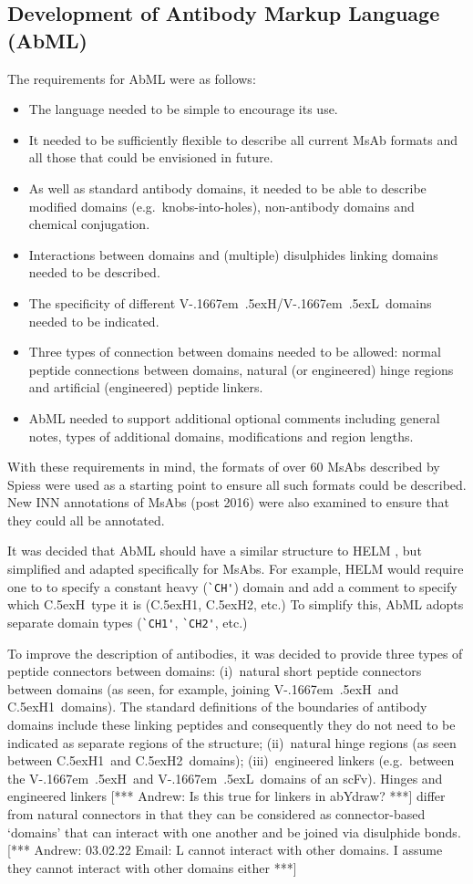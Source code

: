 \documentclass[a4paper]{article}
\newcommand{\VH}{\mbox{V\kern-.1667em \lower.5ex\hbox{\scriptsize H}}}
\newcommand{\VL}{\mbox{V\kern-.1667em \lower.5ex\hbox{\scriptsize L}}}
\newcommand{\VHVL}{\mbox{\VH/\VL}}
\newcommand{\CH}[1]{\mbox{C\lower.5ex\hbox{\scriptsize H}#1}}
\newcommand{\andrew}[1]{{\color{red} [*** Andrew: #1 ***]}}
\let\shortcite\cite
\begin{document}
\subsection{Development of Antibody Markup Language (AbML)}
The requirements for AbML were as follows:
\begin{itemize}
\item The language needed to be simple to encourage its use.
\item It needed to be sufficiently flexible to describe all current
  MsAb formats and all those that could be envisioned in future.
\item As well as standard antibody domains, it needed to be able to
  describe modified domains (e.g.\ knobs-into-holes), non-antibody
  domains and chemical conjugation.
\item Interactions between domains and (multiple) disulphides linking
  domains needed to be described.
\item The specificity of different \VHVL\ domains needed to be
  indicated.
\item Three types of connection between domains needed to be allowed:
  normal peptide connections between domains, natural (or engineered)
  hinge regions and artificial (engineered) peptide linkers.
\item AbML needed to support additional optional comments including
  general notes, types of additional domains, modifications and region
  lengths.
\end{itemize}
  
With these requirements in mind, the formats of over 60 MsAbs
described by Spiess \shortcite{spiess:2015} were used as a starting
point to ensure all such formats could be described. New INN
annotations of MsAbs (post 2016) were also examined to ensure that
they could all be annotated.

It was decided that AbML should have a similar structure to HELM
\cite{zhang:2012}, but simplified and adapted specifically for MsAbs.
For example, HELM would require one to
to specify a constant heavy (\verb|`CH'|) domain and add a
comment to specify which \CH\ type it is (\CH{1}, \CH{2}, etc.)
To simplify this, AbML adopts separate domain types (\verb|`CH1'|,
\verb|`CH2'|, etc.)

To improve the description of antibodies, it was decided to provide
three types of peptide connectors between domains: (i)~natural short
peptide connectors between domains (as seen, for example, joining \VH\
and \CH1\ domains). The standard definitions of the boundaries of
antibody domains include these linking peptides and consequently they
do not need to be indicated as separate regions of the structure;
(ii)~natural hinge regions (as seen between \CH1\ and \CH2\ domains);
(iii)~engineered linkers (e.g.\ between the \VH\ and \VL\ domains of
an scFv). Hinges and engineered linkers \andrew{Is this true for
  linkers in abYdraw?} differ from natural connectors in that they can
be considered as connector-based `domains' that can interact with one
another and be joined via disulphide bonds.
\andrew{03.02.22 Email: L cannot interact with other domains. I
  assume they cannot interact with other domains either}
\end{document}
